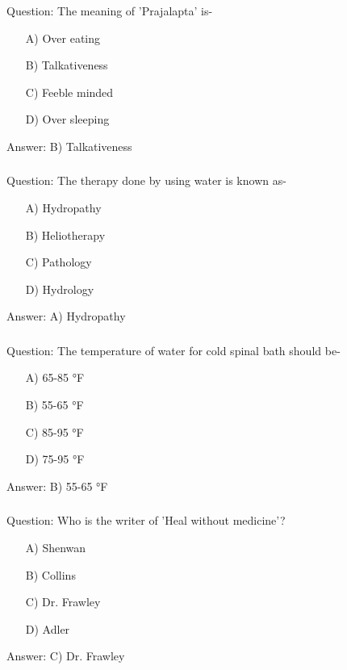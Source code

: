 \begin{frame}[fragile]\frametitle{}

Question: The meaning of 'Prajalapta' is-

\begin{itemize}
\item[A)] Over eating
\item[B)] Talkativeness
\item[C)] Feeble minded
\item[D)] Over sleeping
\end{itemize}

Answer: B) Talkativeness
\end{frame}

\begin{frame}[fragile]\frametitle{}

Question: The therapy done by using water is known as-

\begin{itemize}
\item[A)] Hydropathy
\item[B)] Heliotherapy
\item[C)] Pathology
\item[D)] Hydrology
\end{itemize}

Answer: A) Hydropathy
\end{frame}

\begin{frame}[fragile]\frametitle{}

Question: The temperature of water for cold spinal bath should be-

\begin{itemize}
\item[A)] 65-85 °F
\item[B)] 55-65 °F
\item[C)] 85-95 °F
\item[D)] 75-95 °F
\end{itemize}

Answer: B) 55-65 °F
\end{frame}

\begin{frame}[fragile]\frametitle{}

Question: Who is the writer of 'Heal without medicine'?

\begin{itemize}
\item[A)] Shenwan
\item[B)] Collins
\item[C)] Dr. Frawley
\item[D)] Adler
\end{itemize}

Answer: C) Dr. Frawley
\end{frame}

